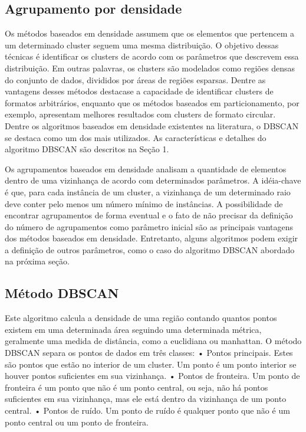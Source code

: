 \subsection{Agrupamento por densidade}
Os métodos baseados em densidade assumem que os elementos que pertencem a
um determinado cluster seguem uma mesma distribuição. O objetivo dessas técnicas é
identificar os clusters de acordo com os parâmetros que descrevem essa distribuição. Em
outras palavras, os clusters são modelados como regiões densas do conjunto de dados,
divididos por áreas de regiões esparsas. Dentre as vantagens desses métodos destacase
a capacidade de identificar clusters de formatos arbitrários, enquanto que os métodos
baseados em particionamento, por exemplo, apresentam melhores resultados com clusters
de formato circular.
Dentre os algoritmos baseados em densidade existentes na literatura, o DBSCAN se destaca
como um dos mais utilizados. As características e detalhes do algoritmo DBSCAN
são descritos na Seção 1.


Os agrupamentos baseados em densidade analisam a quantidade de elementos dentro de uma vizinhança de acordo com determinados parâmetros. A idéia-chave é que, para cada instância de um cluster, a vizinhança de um determinado raio deve conter pelo menos um número mínimo de instâncias.
A possibilidade de encontrar agrupamentos de forma eventual e o fato de não precisar da definição do número de agrupamentos \cite{yip2005} como parâmetro inicial são as principais vantagens dos métodos baseados em densidade. Entretanto, alguns algoritmos podem exigir a definição de outros parâmetros, como o caso do algoritmo DBSCAN \cite{density-based-clusters} abordado na próxima seção.

\subsection{Método DBSCAN}

Este algoritmo calcula a densidade de uma região contando quantos pontos existem em uma determinada área seguindo uma determinada métrica, geralmente uma medida de distância, como a euclidiana ou manhattan. O método DBSCAN separa os pontos de dados em três classes:
• Pontos principais. Estes são pontos que estão no interior de um cluster. Um ponto é um ponto interior se houver pontos suficientes em sua vizinhança.
• Pontos de fronteira. Um ponto de fronteira é um ponto que não é um ponto central, ou seja, não há pontos suficientes em sua vizinhança, mas ele está dentro da vizinhança de um ponto central.
• Pontos de ruído. Um ponto de ruído é qualquer ponto que não é um ponto central ou um ponto de fronteira.


